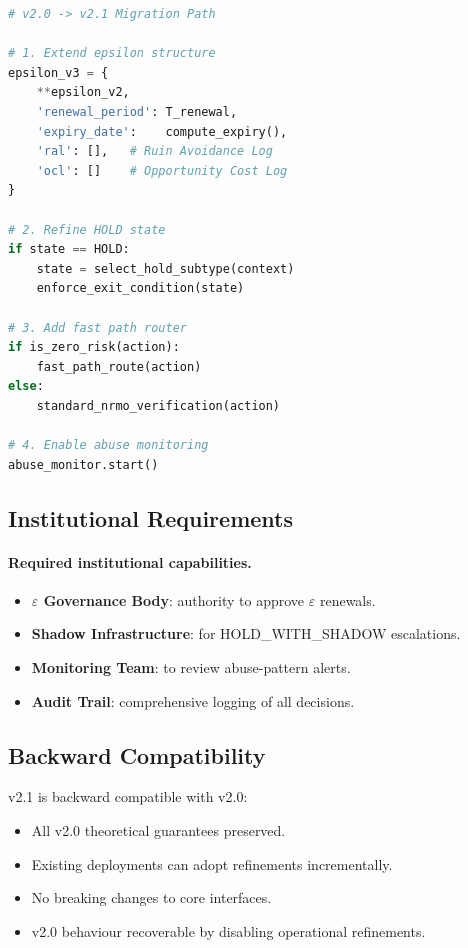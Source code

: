 \begin{lstlisting}[language=Python,basicstyle=\ttfamily\small,frame=single]
# v2.0 -> v2.1 Migration Path

# 1. Extend epsilon structure
epsilon_v3 = {
    **epsilon_v2,
    'renewal_period': T_renewal,
    'expiry_date':    compute_expiry(),
    'ral': [],   # Ruin Avoidance Log
    'ocl': []    # Opportunity Cost Log
}

# 2. Refine HOLD state
if state == HOLD:
    state = select_hold_subtype(context)
    enforce_exit_condition(state)

# 3. Add fast path router
if is_zero_risk(action):
    fast_path_route(action)
else:
    standard_nrmo_verification(action)

# 4. Enable abuse monitoring
abuse_monitor.start()
\end{lstlisting}

\subsection{Institutional Requirements}

\paragraph{Required institutional capabilities.}

\begin{itemize}
\item \textbf{$\varepsilon$ Governance Body}: authority to approve
$\varepsilon$ renewals.
\item \textbf{Shadow Infrastructure}: for HOLD\_WITH\_SHADOW
escalations.
\item \textbf{Monitoring Team}: to review abuse-pattern alerts.
\item \textbf{Audit Trail}: comprehensive logging of all decisions.
\end{itemize}

\subsection{Backward Compatibility}

v2.1 is backward compatible with v2.0:

\begin{itemize}
\item All v2.0 theoretical guarantees preserved.
\item Existing deployments can adopt refinements incrementally.
\item No breaking changes to core interfaces.
\item v2.0 behaviour recoverable by disabling operational
refinements.
\end{itemize}

